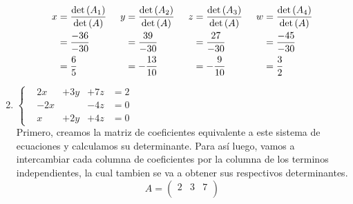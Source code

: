 \begin{enumerate}[label=\listAlph]
\[\begin{aligned}
                    x &= \frac{\text{det} \left( A_1 \right)}{\text{det} \left( A \right)} \\
                    &= \frac{-36}{-30} \\
                    &= \frac{6}{5}
                \end{aligned}
                \hspace{0.5cm}
                \begin{aligned}
                    y &= \frac{\text{det} \left( A_2 \right)}{\text{det} \left( A \right)} \\
                    &= \frac{39}{-30} \\
                    &= -\frac{13}{10}
                \end{aligned}
                \hspace{0.5cm}
                \begin{aligned}
                    z &= \frac{\text{det} \left( A_3 \right)}{\text{det} \left( A \right)} \\
                    &= \frac{27}{-30} \\
                    &= -\frac{9}{10}
                \end{aligned}
                \hspace{0.5cm}
                \begin{aligned}
                    w &= \frac{\text{det} \left( A_4 \right)}{\text{det} \left( A \right)} \\
                    &= \frac{-45}{-30} \\
                    &= \frac{3}{2}
                \end{aligned}
            \]
        \item 
            \(
                \left\{
                \begin{aligned}
                    &2x &+ 3y &+ 7z &= 2 \\
                    &-2x &\phantom{+0y} &- 4z &= 0 \\
                    &x &+ 2y &+ 4z &= 0
                \end{aligned}
                \right.
            \) \\
            Primero, creamos la matriz de coeficientes equivalente a este sistema de ecuaciones y calculamos su determinante. 
            Para así luego, vamos a intercambiar cada columna de coeficientes por la columna de los terminos independientes,
            la cual tambien se va a obtener sus respectivos determinantes.
            \[
                A = 
                \begin{pmatrix}
                    2 & 3 & 7 \\

\end{pmatrix}\]
\end{enumerate}
